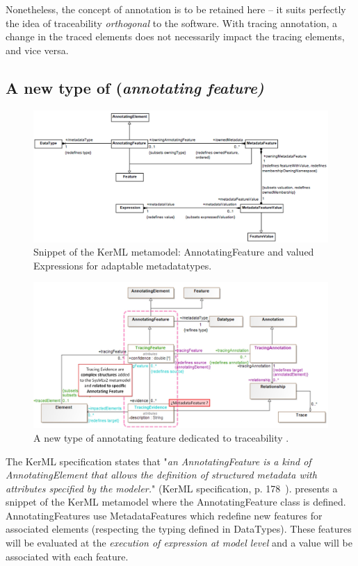 Nonetheless, the concept of annotation is to be retained here -- it suits perfectly the idea of traceability \textit{orthogonal} to the software. With tracing annotation, a change in the traced elements does not necessarily impact the tracing elements, and vice versa.



\subsection{A new type of (\textit{annotating feature)}}
\begin{figure}[h]     
	\centering
	\includegraphics[width=.99\linewidth]{images/kerml-annotatingfeature.jpg}
	\caption{Snippet of the KerML metamodel: AnnotatingFeature and valued Expressions for adaptable metadatatypes.}
	\label{fig:kermlannot}
\end{figure}

\begin{figure}[h]     
	\centering
	\includegraphics[width=.99\linewidth]{images/strategy3-annotatingfeature.jpg}
	\caption{A new type of annotating feature dedicated to traceability .}
	\label{fig:strategy3}
\end{figure}

The KerML specification states that "\textit{an AnnotatingFeature is a kind of AnnotatingElement that allows the definition of structured metadata with attributes specified by the modeler.}" (KerML specification, p. 178~\cite{kerML}).  presents a snippet of the KerML metamodel where the AnnotatingFeature class is defined. AnnotatingFeatures use MetadataFeatures which redefine new features for associated elements (respecting the typing defined in DataTypes). These features will be evaluated at the \textit{execution of expression at model level} and a value will be associated with each feature.

